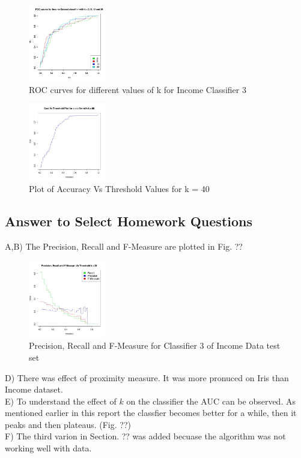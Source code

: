 	\begin{figure}
		\label{fig:classifier1_roc}
		\caption{ROC curves for different values of k for Income Classifier 3}
		\centering
		\includegraphics[width=0.3\textwidth]{images/income_classifier3/roc.jpg}
	\end{figure}
	\begin{figure}
		\label{fig:classifier3_accuracy}
		\caption{Plot of Accuracy Vs Threshold Values for k = 40}
		\centering
		\includegraphics[width=0.3\textwidth]{images/income_classifier3/accuracy.jpg}
	\end{figure}
	
\subsection{Answer to Select Homework Questions}
A,B) The Precision, Recall and F-Measure  are plotted in Fig. ??\\
\begin{figure}
	\label{fig:confusion}
	\caption{Precision, Recall and F-Measure for Classifier 3 of Income Data test set}
	\centering
	\includegraphics[width=0.3\textwidth]{images/prf.jpg}
\end{figure}
D) There was effect of proximity measure. It was more pronuced on Iris than Income dataset.\\
E) To understand the effect of $k$ on the classifier the AUC can be observed. As mentioned earlier in this report the classfier becomes better for a while, then it peaks and then plateaus. (Fig. ??)\\
F) The third varion in Section. ?? was added becuase the algorithm was not working well with data.
